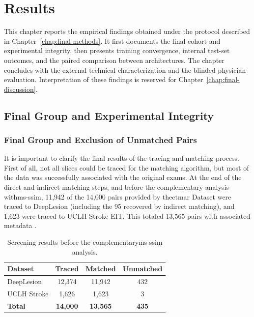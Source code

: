 \chapter{Results}
\label{chap:final-results}
This chapter reports the empirical findings obtained under the protocol described in Chapter~\ref{chap:final-methods}. It first documents the final cohort and experimental integrity, then presents training convergence, internal test-set outcomes, and the paired comparison between architectures. The chapter concludes with the external technical characterization and the blinded physician evaluation. Interpretation of these findings is reserved for Chapter~\ref{chap:final-discussion}.

\section{Final Group and Experimental Integrity}
\subsection{Final Group and Exclusion of Unmatched Pairs}

It is important to clarify the final results of the tracing and matching process. First of all, not all slices could be traced for the matching algorithm, but most of the data was successfully associated with the original exams. At the end of the direct and indirect matching steps, and before the complementary analysis with\acrshort{ms-ssim}, 11,942 of the 14,000 pairs provided by the\acrshort{ctmar} Dataset were traced to DeepLesion (including the 95 recovered by indirect matching), and 1,623 were traced to UCLH Stroke EIT. This totaled 13,565 pairs with associated metadata .

\begin{table}[H]
    \centering
    \begin{tabular}{lccc}
        \hline
        \textbf{Dataset} & \textbf{Traced} & \textbf{Matched} & \textbf{Unmatched} \\
        \hline
        DeepLesion & 12,374 & 11,942 & 432 \\
        UCLH Stroke & 1,626  & 1,623  & 3   \\
        \hline
        \textbf{Total}  & \textbf{14,000} & \textbf{13,565} & \textbf{435} \\
        \hline
    \end{tabular}
    \centering
    \captionsetup{skip=2pt}
    \caption[Initial pair-matching screening]{Screening results before the complementary\acrshort{ms-ssim} analysis.}
    \label{tab:final-rastreio-msssim}
\end{table}
